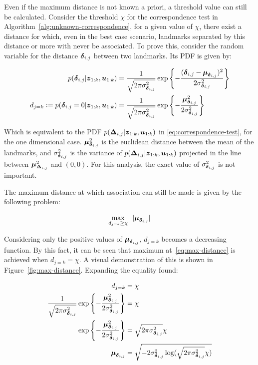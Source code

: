 Even if the maximum distance is not known a priori, a threshold value can still be calculated. Consider the threshold $\chi$ for the correspondence test in Algorithm~\ref{alg:unknown-correspondence}, for a given value of $\chi$, there exist a distance for which, even in the best case scenario, landmarks separated by this distance or more with never be associated. To prove this, consider the random variable for the distance  $\boldsymbol{\delta}_{i,j}$ between two landmarks. Its PDF is given by:

\begin{align}
p(\boldsymbol{\delta}_{i,j}|\boldsymbol{z}_{1:k},\boldsymbol{u}_{1:k})&=
\frac{1}{\sqrt{2\pi\sigma_{\boldsymbol{\delta}_{i,j}}^2}}
\exp\left\lbrace -\frac{(\boldsymbol{\delta}_{i,j}-\boldsymbol{\mu}_{\boldsymbol{\delta}_{i,j}})^2}{2\sigma_{\boldsymbol{\delta}_{i,j}}^2}\right\rbrace\\
d_{j=k} \vcentcolon= p(\boldsymbol{\delta}_{i,j}=0|\boldsymbol{z}_{1:k},\boldsymbol{u}_{1:k})&=
\frac{1}{\sqrt{2\pi\sigma_{\boldsymbol{\delta}_{i,j}}^2}}
\exp\left\lbrace -\frac{\boldsymbol{\mu}_{\boldsymbol{\delta}_{i,j}}^2}{2\sigma_{\boldsymbol{\delta}_{i,j}}^2}\right\rbrace 
\end{align}

Which is equivalent to the PDF $p(\boldsymbol{\Delta}_{i,j}|\boldsymbol{z}_{1:k},\boldsymbol{u}_{1:k})$ in \eqref{eq:correspondence-test}, for the one dimensional case. $\boldsymbol{\mu}_{\boldsymbol{\delta}_{i,j}}^2$ is the euclidean distance between the mean of the landmarks, and $\sigma_{\boldsymbol{\delta}_{i,j}}^2$ is the variance of $p(\boldsymbol{\Delta}_{i,j}|\boldsymbol{z}_{1:k},\boldsymbol{u}_{1:k})$ projected in the line between $\boldsymbol{\mu}_{\boldsymbol{\Delta}_{i,j}}^2$ and $(0,0)$. For this analysis, the exact value of $\sigma_{\boldsymbol{\delta}_{i,j}}^2$ is not important.

The maximum distance at which association can still be made is given by the following problem:

\begin{equation}
\underset{d_{j=k}\geq\chi}{\text{max}}~~  |\boldsymbol{\mu}_{\boldsymbol{\delta}_{i,j}}|
\label{eq:max-distance}
\end{equation}

Considering only the positive values of $\boldsymbol{\mu}_{\boldsymbol{\delta}_{i,j}}$, $d_{j=k}$ becomes a decreasing function. By this fact, it can be seen that maximum at~\eqref{eq:max-distance} is achieved when $d_{j=k}=\chi$. A visual demonstration of this is shown in Figure~\ref{fig:max-distance}. Expanding the equality found:

\begin{align}
d_{j=k} &= \chi\\
\frac{1}{\sqrt{2\pi\sigma_{\boldsymbol{\delta}_{i,j}}^2}}
\exp\left\lbrace -\frac{\boldsymbol{\mu}_{\boldsymbol{\delta}_{i,j}}^2}{2\sigma_{\boldsymbol{\delta}_{i,j}}^2}\right\rbrace &= \chi \\
\exp\left\lbrace -\frac{\boldsymbol{\mu}_{\boldsymbol{\delta}_{i,j}}^2}{2\sigma_{\boldsymbol{\delta}_{i,j}}^2}\right\rbrace&= \sqrt{2\pi\sigma_{\boldsymbol{\delta}_{i,j}}^2} \chi\\
\boldsymbol{\mu}_{\boldsymbol{\delta}_{i,j}} &= \sqrt{-2\sigma_{\boldsymbol{\delta}_{i,j}}^2\log(\sqrt{2\pi\sigma_{\boldsymbol{\delta}_{i,j}}^2} \chi)} \label{eq:max-distance-exp}
\end{align}

